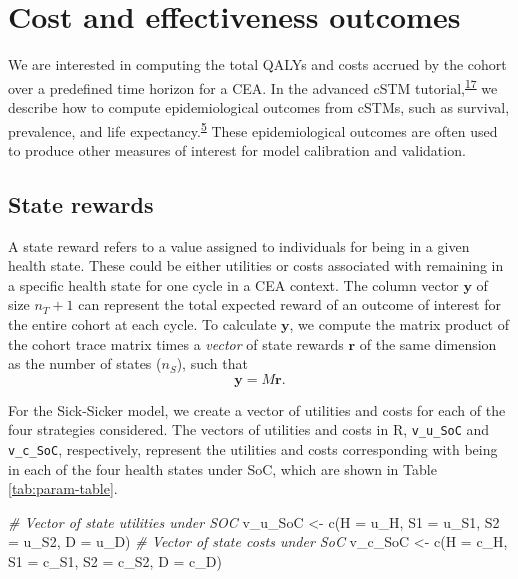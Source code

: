\documentclass[
]{article}
\newenvironment{Shaded}{\begin{snugshade}}{\end{snugshade}}
\newcommand{\AttributeTok}[1]{\textcolor[rgb]{0.77,0.63,0.00}{#1}}
\newcommand{\CommentTok}[1]{\textcolor[rgb]{0.56,0.35,0.01}{\textit{#1}}}
\newcommand{\FunctionTok}[1]{\textcolor[rgb]{0.00,0.00,0.00}{#1}}
\newcommand{\NormalTok}[1]{#1}
\newcommand{\OtherTok}[1]{\textcolor[rgb]{0.56,0.35,0.01}{#1}}
\begin{document}
\hypertarget{cost-and-effectiveness-outcomes}{%
\section{Cost and effectiveness outcomes}\label{cost-and-effectiveness-outcomes}}

We are interested in computing the total QALYs and costs accrued by the cohort over a predefined time horizon for a CEA. In the advanced cSTM tutorial,\textsuperscript{\protect\hyperlink{ref-Alarid-Escudero2021b}{17}} we describe how to compute epidemiological outcomes from cSTMs, such as survival, prevalence, and life expectancy.\textsuperscript{\protect\hyperlink{ref-Siebert2012c}{5}} These epidemiological outcomes are often used to produce other measures of interest for model calibration and validation.

\hypertarget{state-rewards}{%
\subsection{State rewards}\label{state-rewards}}

A state reward refers to a value assigned to individuals for being in a given health state. These could be either utilities or costs associated with remaining in a specific health state for one cycle in a CEA context. The column vector \(\mathbf{y}\) of size \(n_T+1\) can represent the total expected reward of an outcome of interest for the entire cohort at each cycle. To calculate \(\mathbf{y}\), we compute the matrix product of the cohort trace matrix times a \emph{vector} of state rewards \(\mathbf{r}\) of the same dimension as the number of states (\(n_S\)), such that
\begin{equation}
  \mathbf{y} = M\mathbf{r}.
  \label{eq:exp-rew-cycle}
\end{equation}

For the Sick-Sicker model, we create a vector of utilities and costs for each of the four strategies considered. The vectors of utilities and costs in R, \texttt{v\_u\_SoC} and \texttt{v\_c\_SoC}, respectively, represent the utilities and costs corresponding with being in each of the four health states under SoC, which are shown in Table \ref{tab:param-table}.

\begin{Shaded}
\begin{Highlighting}[]
\CommentTok{\# Vector of state utilities under SOC}
\NormalTok{v\_u\_SoC }\OtherTok{\textless{}{-}} \FunctionTok{c}\NormalTok{(}\AttributeTok{H =}\NormalTok{ u\_H, }\AttributeTok{S1 =}\NormalTok{ u\_S1, }\AttributeTok{S2 =}\NormalTok{ u\_S2, }\AttributeTok{D =}\NormalTok{ u\_D)}
\CommentTok{\# Vector of state costs under SoC}
\NormalTok{v\_c\_SoC }\OtherTok{\textless{}{-}} \FunctionTok{c}\NormalTok{(}\AttributeTok{H =}\NormalTok{ c\_H, }\AttributeTok{S1 =}\NormalTok{ c\_S1, }\AttributeTok{S2 =}\NormalTok{ c\_S2, }\AttributeTok{D =}\NormalTok{ c\_D)}
\end{Highlighting}
\end{Shaded}
\end{document}
